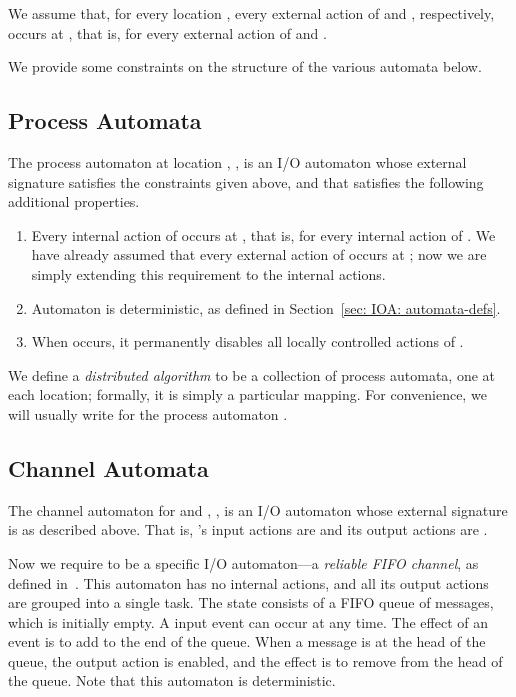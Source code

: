 \documentclass[11pt]{article}
\numberwithin{theorem}{section}
\begin{document}
We assume that, for every location , every external action of
 and , respectively, occurs at , that is,  for every external
action  of  and .

We provide some constraints on the structure of the various automata
below.

\subsection{Process Automata}
\label{subsec:processAutomata}

The process automaton at location , , is an I/O automaton
whose external signature satisfies the constraints given above, and
that satisfies the following additional properties.
\begin{enumerate}
\item
Every internal action of  occurs at , that is,
 for every internal action  of .  
We have already assumed that every external action of  occurs
at ; now we are simply extending this requirement to the internal
actions.



\item
Automaton  is deterministic, as defined in Section~\ref{sec:
  IOA:  automata-defs}.

\item
When  occurs, it permanently disables all locally controlled
actions of .  
\end{enumerate}

We define a \emph{distributed algorithm}  to be a collection of
process automata, one at each location; formally, it is simply a
particular  mapping.  
For convenience, we will usually write  for the process automaton
.

\subsection{Channel Automata}
\label{subsec:channelAutomata}

The channel automaton for  and , , is an I/O automaton
whose external signature is as described above.
That is, 's input actions are  and its output actions are .

Now we require  to be a specific I/O automaton---a
\emph{reliable FIFO channel}, as defined in~\cite{lync:da}.
This automaton has no internal actions, and all its output actions are
grouped into a single task.
The state consists of a FIFO queue of messages, which is initially empty.
A  input event can occur at any time. 
The effect of an event  is to add  to the end of the
queue. 
When a message  is at the head of the queue, the output action
 is enabled, and the effect is to remove  from the
head of the queue.
Note that this automaton  is deterministic.
\end{document}
